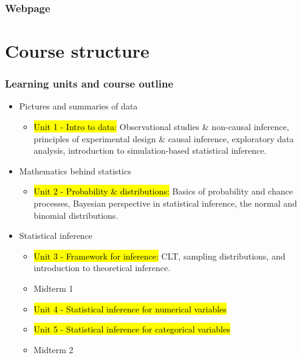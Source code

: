 \documentclass[slidestop,compress,mathserif,12pt,t,professionalfonts,xcolor=table]{beamer}
\begin{document}

\begin{frame}
\frametitle{Webpage}

\vfill

\centering
{\Large 
\webURL{\CourseSite} 
}

\end{frame}


\section{Course structure}


\begin{frame}[shrink]
\frametitle{Learning units and course outline}

\begin{itemize}

\item Pictures and summaries of data
\begin{itemize}
\item \hl{Unit 1 - Intro to data:} Observational studies \& non-causal inference, 
principles of experimental design \& causal inference, exploratory data analysis, 
introduction to simulation-based statistical inference.
\end{itemize}

\item Mathematics behind statistics
\begin{itemize}
\item \hl{Unit 2 - Probability \& distributions:} Basics of probability and chance 
processes, Bayesian perspective in statistical inference, the normal and binomial 
distributions.
\end{itemize}

\item Statistical inference
\begin{itemize}
\item \hl{Unit 3 - Framework for inference:} CLT, sampling distributions, and 
introduction to theoretical inference.
\item Midterm 1
\item \hl{Unit 4 - Statistical inference for numerical variables}
\item \hl{Unit 5 - Statistical inference for categorical variables}
\item Midterm 2
\end{itemize}


\end{itemize}
\end{frame}
\end{document}
